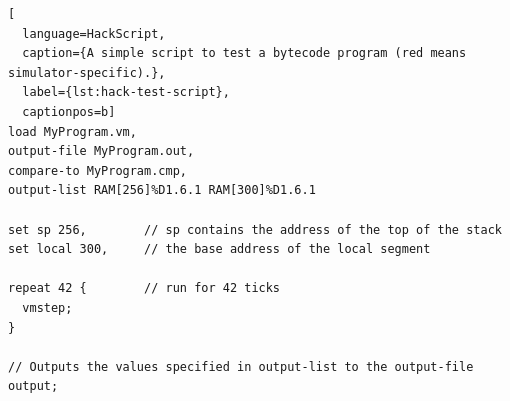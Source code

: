 \begin{lstlisting}[
  language=HackScript,
  caption={A simple script to test a bytecode program (red means simulator-specific).},
  label={lst:hack-test-script},
  captionpos=b]
load MyProgram.vm,
output-file MyProgram.out,
compare-to MyProgram.cmp,
output-list RAM[256]%D1.6.1 RAM[300]%D1.6.1

set sp 256,        // sp contains the address of the top of the stack
set local 300,     // the base address of the local segment

repeat 42 {        // run for 42 ticks
  vmstep;
}

// Outputs the values specified in output-list to the output-file
output;
\end{lstlisting}
